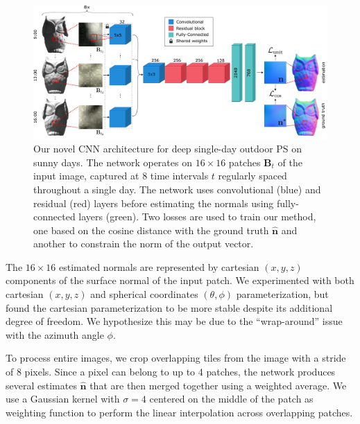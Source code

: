 \begin{figure}[t]
	\centering
	\includegraphics[width=0.8\linewidth]{figures/architecture.pdf}
	\caption[]{Our novel CNN architecture for deep single-day outdoor PS on sunny days. The network operates on $16 \times 16$ patches $\mathbf{B}_t$ of the input image, captured at 8 time intervals $t$ regularly spaced throughout a single day. The network uses convolutional (blue) and residual (red) layers before estimating the normals using fully-connected layers (green). Two losses are used to train our method, one based on the cosine distance with the ground truth $\mathbf{\hat{n}}$ and another to constrain the norm of the output vector.}
	\label{fig:architecture}
\end{figure}


The $16 \times 16$ estimated normals are represented by cartesian $(x,y,z)$ components of the surface normal of the input patch. We experimented with both cartesian $(x,y,z)$ and spherical coordinates $(\theta,\phi)$ parameterization, but found the cartesian parameterization to be more stable despite its additional degree of freedom. We hypothesize this may be due to the ``wrap-around'' issue with the azimuth angle $\phi$. 

To process entire images, we crop overlapping tiles from the image with a stride of 8 pixels. Since a pixel can belong to up to 4 patches, the network produces several estimates $\mathbf{\hat{n}}$ that are then merged together using a weighted average. We use a Gaussian kernel with $\sigma=4$ centered on the middle of the patch as weighting function to perform the linear interpolation across overlapping patches. %

